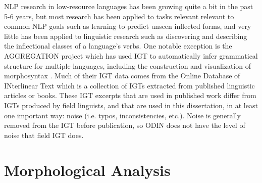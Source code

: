 NLP research in low-resource languages has been growing quite a bit in the past 5-6 years, but most research has been applied to tasks relevant relevant to common NLP goals such as learning to predict unseen inflected forms, and very little has been applied to linguistic research such as discovering and describing the inflectional classes of a language's verbs. One notable exception is the AGGREGATION project \citep{bender_language_2014} which has used IGT to automatically infer grammatical structure for multiple languages, including the construction and visualization of morphosyntax \citep{lepp_visualizing_2019,wax_automated_2014}. Much of their IGT data comes from the Online Database of INterlinear Text \citep[ODIN]{lewis_developing_2010} which is a collection of IGTs extracted from published linguistic articles or books. These IGT excerpts that are used in published work differ from IGTs produced by field linguists, and that are used in this dissertation, in at least one important way: noise (i.e. typos, inconsistencies, etc.). Noise is generally removed from the IGT before publication, so ODIN does not have the level of noise that field IGT does. 

\section{Morphological Analysis}

